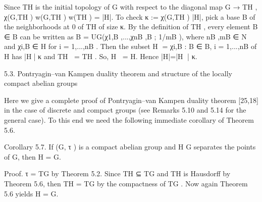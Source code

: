 \documentclass[12pt]{article}
\begin{document}
    Since TH is the initial topology of G with respect to the diagonal map G → TH , χ(G,TH )  w(G,TH )  w(TH ) = |H|. To
check κ := χ(G,TH )  |H|, pick a base B of the neighborhoods at 0 of TH of size κ. By the definition of TH , every element
B ∈ B can be written as B = UG(χ1,B ,...,χnB ,B ; 1/mB ), where nB ,mB ∈ N and χi,B ∈ H for i = 1,...,nB . Then the subset
H = {χi,B : B ∈ B, i = 1,...,nB } of H has |H|  κ and TH = TH . So, H = H. Hence |H|=|H |  κ. 


5.3. Pontryagin–van Kampen duality theorem and structure of the locally compact abelian groups


    Here we give a complete proof of Pontryagin–van Kampen duality theorem [25,18] in the case of discrete and compact
groups (see Remarks 5.10 and 5.14 for the general case). To this end we need the following immediate corollary of
Theorem 5.6.


Corollary 5.7. If (G, τ ) is a compact abelian group and H  G separates the points of G, then H = G.


Proof. τ = TG by Theorem 5.2. Since TH ⊆ TG and TH is Hausdorff by Theorem 5.6, then TH = TG by the compactness
of TG . Now again Theorem 5.6 yields H = G. 
\end{document}
